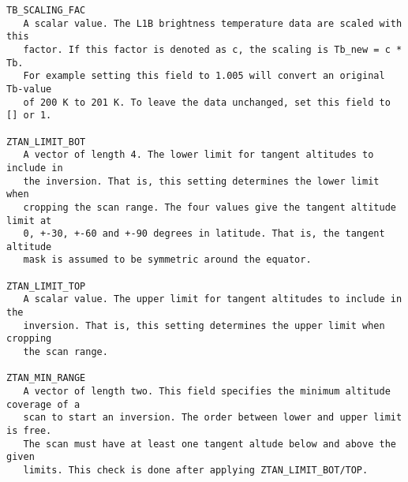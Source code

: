 \begin{verbatim}
TB_SCALING_FAC
   A scalar value. The L1B brightness temperature data are scaled with this
   factor. If this factor is denoted as c, the scaling is Tb_new = c * Tb.
   For example setting this field to 1.005 will convert an original  Tb-value 
   of 200 K to 201 K. To leave the data unchanged, set this field to [] or 1. 

ZTAN_LIMIT_BOT
   A vector of length 4. The lower limit for tangent altitudes to include in
   the inversion. That is, this setting determines the lower limit when
   cropping the scan range. The four values give the tangent altitude limit at
   0, +-30, +-60 and +-90 degrees in latitude. That is, the tangent altitude
   mask is assumed to be symmetric around the equator.  

ZTAN_LIMIT_TOP
   A scalar value. The upper limit for tangent altitudes to include in the
   inversion. That is, this setting determines the upper limit when cropping
   the scan range.

ZTAN_MIN_RANGE 
   A vector of length two. This field specifies the minimum altitude coverage of a
   scan to start an inversion. The order between lower and upper limit is free.
   The scan must have at least one tangent altude below and above the given
   limits. This check is done after applying ZTAN_LIMIT_BOT/TOP.

\end{verbatim}
